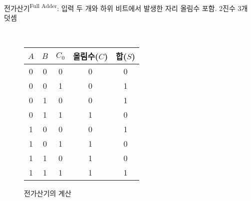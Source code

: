 전가산기\textsuperscript{Full Adder}: 입력 두 개와 하위 비트에서 발생한 자리 올림수 포함. 2진수 3개 덧셈
\begin{figure}[H]
    \centering
    \caption{전가산기의 계산}\phantom{}\\
    \begin{tabular}[1.5]{c|c|c|c|c}
        $A$ & $B$ & $C_0$ & 올림수($C$) & 합($S$) \\
        \hline
        0   & 0   & 0     & 0        & 0      \\
        0   & 0   & 1     & 0        & 1      \\
        0   & 1   & 0     & 0        & 1      \\
        0   & 1   & 1     & 1        & 0      \\
        1   & 0   & 0     & 0        & 1      \\
        1   & 0   & 1     & 1        & 0      \\
        1   & 1   & 0     & 1        & 0      \\
        1   & 1   & 1     & 1        & 1
    \end{tabular}
\end{figure}\phantom{}\\\\
